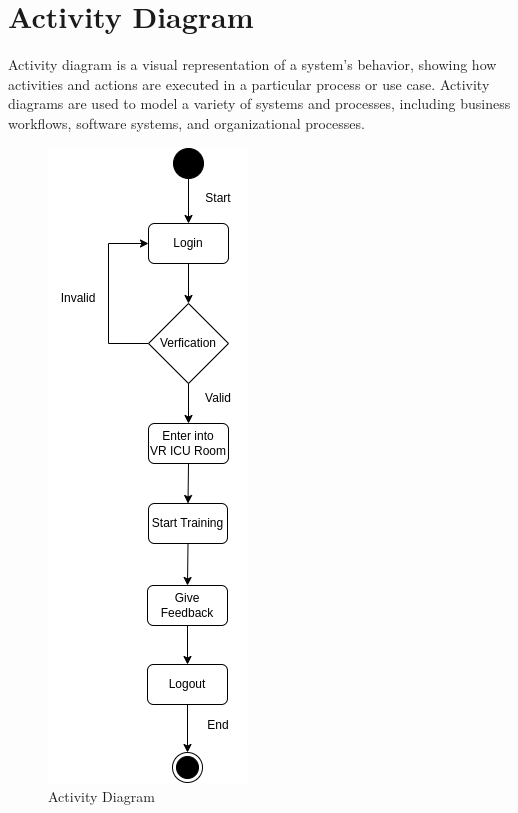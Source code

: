 \section{Activity Diagram}
Activity diagram is a visual representation of a system’s behavior, showing how activities and actions are executed in a particular process or use case. Activity diagrams are used to model a variety of systems and processes, including business workflows, software systems, and organizational processes.
\begin{figure}[h]
    \centering
    \includegraphics[width=0.25\linewidth]{Images/Activity.drawio.png}
    \caption{Activity Diagram}
    \label{fig:system-diagram}
\end{figure}